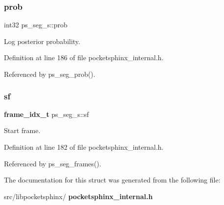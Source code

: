 \mbox{\label{structps__seg__s_ae683244d90d0a5339930b47757778432}} 
\subsubsection{prob}
{\footnotesize\ttfamily int32 ps\+\_\+seg\+\_\+s\+::prob}



Log posterior probability. 



Definition at line 186 of file pocketsphinx\+\_\+internal.\+h.



Referenced by ps\+\_\+seg\+\_\+prob().

\mbox{\label{structps__seg__s_a885a599726cd0efba573d106d016e6e2}} 
\subsubsection{sf}
{\footnotesize\ttfamily \textbf{ frame\+\_\+idx\+\_\+t} ps\+\_\+seg\+\_\+s\+::sf}



Start frame. 



Definition at line 182 of file pocketsphinx\+\_\+internal.\+h.



Referenced by ps\+\_\+seg\+\_\+frames().



The documentation for this struct was generated from the following file\+:\begin{DoxyCompactItemize}
\item 
src/libpocketsphinx/\textbf{ pocketsphinx\+\_\+internal.\+h}\end{DoxyCompactItemize}
